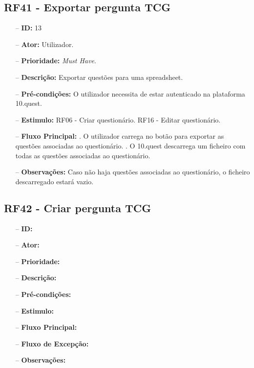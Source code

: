 \subsection{RF41 - Exportar pergunta TCG}
\begin{itemize}
	\item[--] \textbf{ID:} 13
	\item[--]  \textbf{Ator:} Utilizador.
	\item[--]  \textbf{Prioridade:} \textit{Must Have}.
	\item[--]  \textbf{Descrição:} Exportar questões para uma spreadsheet.
	\item[--]  \textbf{Pré-condições:} O utilizador necessita de estar autenticado na plataforma 10.quest.
	\item[--]  \textbf{Estimulo:}  
	\subitem RF06 - Criar questionário.
	\subitem RF16 - Editar questionário.
	\item[--]  \textbf{Fluxo Principal:} 
	. O utilizador carrega no botão para exportar as questões associadas ao questionário.
	. O 10.quest descarrega um ficheiro com todas as questões associadas ao questionário.
	\item[--]  \textbf{Observações:} Caso não haja questões associadas ao questionário, o ficheiro descarregado estará vazio.
\end{itemize}
\newpage

\subsection{RF42 - Criar pergunta TCG}
\begin{itemize}
	\item[--] \textbf{ID:} 
	\item[--]  \textbf{Ator:} 
	\item[--]  \textbf{Prioridade:} 
	\item[--]  \textbf{Descrição:} 
	\item[--]  \textbf{Pré-condições:} 
	\item[--]  \textbf{Estimulo:}
	\item[--]  \textbf{Fluxo Principal:} 
	\subitem
	\subitem
	\subitem
	\subitem
	\item[--]  \textbf{Fluxo de Excepção:} 
	\subitem
	\subitem
	\subitem
	\subitem
	\item[--]  \textbf{Observações:} 
\end{itemize}
\newpage

